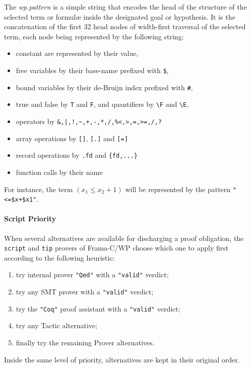 The \textit{wp.pattern} is a simple string that encodes the head of the structure of the
selected term or formulæ inside the designated goal or hypothesis. It is the concatenation of
the first 32 head nodes of width-first traversal of the selected term, each node being represented by
the following string:
\begin{itemize}
    \item constant are represented by their value,
    \item free variables by their base-name prefixed with \verb'$',
    \item bound variables by their de-Bruijn index prefixed with \verb'#',
    \item true and false by \verb"T" and \verb"F", and quantifiers by \verb"\F" and \verb"\E",
    \item operators by \verb"&,|,!,~,+,-,*,/,%<,>,=,>=,/,?"
    \item array operations by \verb"[]", \verb"[.]" and \verb"[=]"
    \item record operations by \verb".fd" and \verb"{fd,...}"
    \item function calls by their name
\end{itemize}

For instance, the term $(x_1 \leq x_2+1)$ will be represented by the pattern \verb|"<=$x+$x1"|.

\paragraph{Script Priority} When several alternatives are available for
discharging a proof obligation, the \texttt{script} and \texttt{tip} provers
of \textsf{Frama-C/WP} choose which one to apply first according to the
following heuristic:
\begin{enumerate}
    \item try internal prover \texttt{"Qed"} with a \texttt{"valid"} verdict;
    \item try any SMT prover with a \texttt{"valid"} verdict;
    \item try the \texttt{"Coq"} proof assistant with a \texttt{"valid"} verdict;
    \item try any Tactic alternative;
    \item finally try the remaining Prover alternatives.
\end{enumerate}

Inside the same level of priority, alternatives are kept in their original
order.

